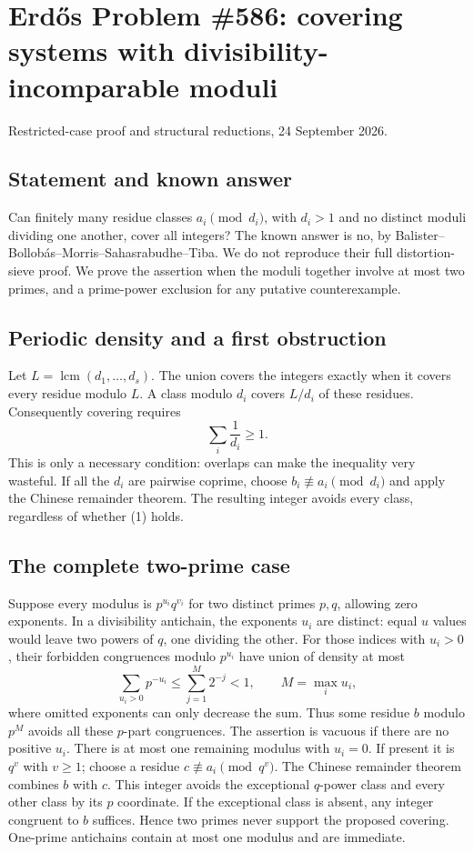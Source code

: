 \section{Erd\H{o}s Problem \#586: covering systems with divisibility-incomparable moduli}
\noindent Restricted-case proof and structural reductions, 24 September 2026.

\subsection*{Statement and known answer}
Can finitely many residue classes $a_i\pmod {d_i}$, with $d_i>1$ and no distinct moduli dividing one another, cover all integers? The known answer is no, by Balister--Bollob\'as--Morris--Sahasrabudhe--Tiba. We do not reproduce their full distortion-sieve proof. We prove the assertion when the moduli together involve at most two primes, and a prime-power exclusion for any putative counterexample.

\subsection*{Periodic density and a first obstruction}
Let $L=\operatorname{lcm}(d_1,\ldots,d_s)$. The union covers the integers exactly when it covers every residue modulo $L$. A class modulo $d_i$ covers $L/d_i$ of these residues. Consequently covering requires
\[\sum_i\frac1{d_i}\geq1.\tag{1}\]
This is only a necessary condition: overlaps can make the inequality very wasteful.
If all the $d_i$ are pairwise coprime, choose $b_i\not\equiv a_i\pmod {d_i}$ and apply the Chinese remainder theorem. The resulting integer avoids every class, regardless of whether (1) holds.

\subsection*{The complete two-prime case}
Suppose every modulus is $p^{u_i}q^{v_i}$ for two distinct primes $p,q$, allowing zero exponents. In a divisibility antichain, the exponents $u_i$ are distinct: equal $u$ values would leave two powers of $q$, one dividing the other. For those indices with $u_i>0$, their forbidden congruences modulo $p^{u_i}$ have union of density at most
\[\sum_{u_i>0}p^{-u_i}\leq\sum_{j=1}^{M}2^{-j}<1,
\qquad M=\max_i u_i,
\]
where omitted exponents can only decrease the sum. Thus some residue $b$ modulo $p^M$ avoids all these $p$-part congruences. The assertion is vacuous if there are no positive $u_i$.
There is at most one remaining modulus with $u_i=0$. If present it is $q^v$ with $v\geq1$; choose a residue $c\not\equiv a_i\pmod {q^v}$. The Chinese remainder theorem combines $b$ with $c$. This integer avoids the exceptional $q$-power class and every other class by its $p$ coordinate. If the exceptional class is absent, any integer congruent to $b$ suffices. Hence two primes never support the proposed covering. One-prime antichains contain at most one modulus and are immediate.

